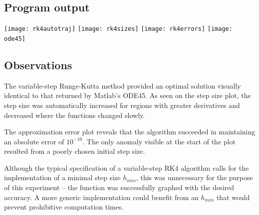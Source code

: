 \documentclass{article}
\begin{document}
	\subsection{Program output}
	
	\texttt{[image: rk4autotraj]}
	\texttt{[image: rk4sizes]}
	\texttt{[image: rk4errors]}
	\texttt{[image: ode45]}
	
	\newpage
	\subsection{Observations}
	
	The variable-step Runge-Kutta method provided an optimal solution
	visually identical to that returned by Matlab's ODE45. As seen on the
	step size plot, the step size was automatically increased for regions
	with greater derivatives and decreased where the functions changed
	slowly.
	
	The approximation error plot reveals that the algorithm succeeded in
	maintaining an absolute error of $10^{-10}$. The only anomaly visible
	at the start of the plot resulted from a poorly chosen initial step
	size.
	
	Although the typical specification of a variable-step RK4 algorithm
	calls for the implementation of a minimal step size $h_{min}$, this was
	unnecessary for the purpose of this experiment -- the function was
	successfully graphed with the desired accuracy. A more generic
	implementation could benefit from an $h_{min}$ that would prevent
	prohibitive computation times.
	
\end{document}
